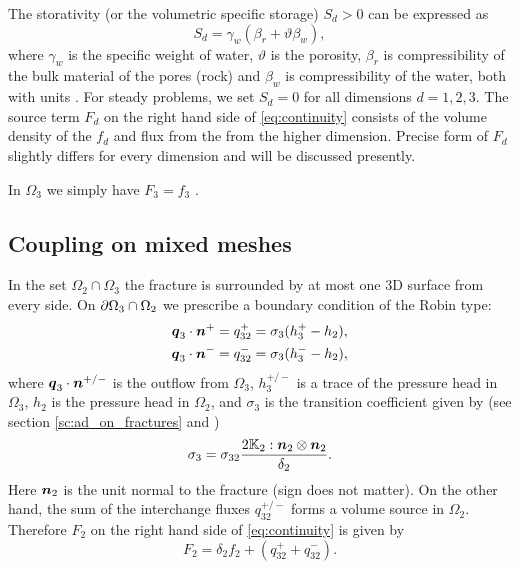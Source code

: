 The storativity (or the volumetric specific storage) $S_d>0$ can be expressed as
\begin{equation}
  S_d = \gamma_w(\beta_r + \vartheta \beta_w),
\end{equation}
where $\gamma_w$  is the specific weight of water, $\vartheta$ \units{}{}{} is the porosity,
$\beta_r$ is compressibility of the bulk material of the pores (rock)
and $\beta_w$ is compressibility of the water, both with units . For steady problems, we set $S_d=0$ for all dimensions $d=1,2,3$.
The source term $F_d$ on the right hand side of \eqref{eq:continuity} consists of the volume density of the 
 $f_d$ and flux from the from the higher dimension. 
Precise form of $F_d$ slightly differs for every dimension and will be discussed presently.

In $\Omega_3$ we simply have $F_3  = f_3$ .

\subsection{Coupling on mixed meshes}
In the set $\Omega_2 \cap \Omega_3$ the fracture is surrounded by at most one 3D surface from every side.
On $\partial\Omega_3 \cap \Omega_2$ we prescribe a boundary condition of the Robin type:
\begin{align*}
        \mathbf{\boldsymbol{q}}_3\cdot \mathbf{\boldsymbol{n}}^{+} &= q_{32}^{+} =\sigma_{3} (h_3^{+}-h_2),\\
        \mathbf{\boldsymbol{q}}_3\cdot \mathbf{\boldsymbol{n}}^{-} &= q_{32}^{-} =\sigma_{3} (h_3^{-}-h_2),
\end{align*}
where $\mathbf{\boldsymbol{q}}_3\cdot\mathbf{\boldsymbol{n}}^{+/-}$  is the outflow from $\Omega_3$, $h_3^{+/-}$ is
a trace of the pressure head in $\Omega_3$, $h_2$ is the pressure head in $\Omega_2$, and 
$\sigma_{3}$  is the transition coefficient given by (see section \ref{sc:ad_on_fractures} and \cite{martin_modeling_2005})
\[
\label{e:sigma3_law}
  \sigma_3 = \sigma_{32} \frac{2\tn K_2 :\vc n_2\otimes\vc n_2 }{\delta_2}.
\]
Here $\mathbf{\boldsymbol{n}}_2$ is the unit normal to the fracture (sign does not matter).
On the other hand, the sum of the interchange fluxes $q_{32}^{+/-}$ forms
a volume source in $\Omega_2$.  Therefore $F_2$  on the right hand side of \eqref{eq:continuity} is
given by
\begin{equation}
   \label{source_2D}
   F_2 = \delta_2 f_2 + (q_{32}^{+} + q_{32}^{-}).
\end{equation}

